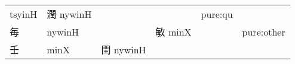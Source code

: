 \documentclass[14pt,a4paper]{scrartcl}
\begin{document}
\begin{longtable}[c]{@{}llllll@{}}
\begin{minipage}[t]{0.14\columnwidth}
tsyinH
\strut\end{minipage} &
\begin{minipage}[t]{0.14\columnwidth}\raggedright\strut
潤 nywinH
\strut\end{minipage} &
\begin{minipage}[t]{0.14\columnwidth}\raggedright\strut
\strut\end{minipage} &
\begin{minipage}[t]{0.14\columnwidth}\raggedright\strut
\strut\end{minipage} &
\begin{minipage}[t]{0.14\columnwidth}\raggedright\strut
pure:qu
\strut\end{minipage}\tabularnewline
\begin{minipage}[t]{0.14\columnwidth}\raggedright\strut
毎
\strut\end{minipage} &
\begin{minipage}[t]{0.14\columnwidth}\raggedright\strut
nywinH
\strut\end{minipage} &
\begin{minipage}[t]{0.14\columnwidth}\raggedright\strut
\strut\end{minipage} &
\begin{minipage}[t]{0.14\columnwidth}\raggedright\strut
敏 minX
\strut\end{minipage} &
\begin{minipage}[t]{0.14\columnwidth}\raggedright\strut
\strut\end{minipage} &
\begin{minipage}[t]{0.14\columnwidth}\raggedright\strut
pure:other
\strut\end{minipage}\tabularnewline
\begin{minipage}[t]{0.14\columnwidth}\raggedright\strut
壬
\strut\end{minipage} &
\begin{minipage}[t]{0.14\columnwidth}\raggedright\strut
minX
\strut\end{minipage} &
\begin{minipage}[t]{0.14\columnwidth}\raggedright\strut
閏 nywinH
\strut\end{minipage} &
\begin{minipage}[t]{0.14\columnwidth}\raggedright\strut
\strut\end{minipage} &
\begin{minipage}[t]{0.14\columnwidth}\raggedright\strut
\strut\end{minipage} &
\begin{minipage}[t]{0.14\columnwidth}\raggedright\strut

\end{minipage}
\end{longtable}
\end{document}
